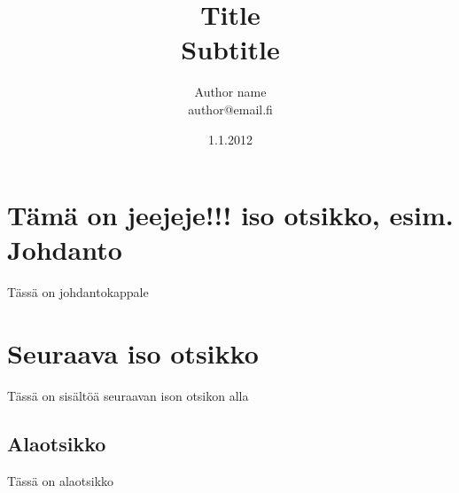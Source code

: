 \documentclass[a4paper]{article}
\begin{document}
\title{\huge Title \\ \large Subtitle}
\date{1.1.2012}
\author{Author name \\ author@email.fi}
\maketitle

\large

\section{Tämä on jeejeje!!! iso otsikko, esim. Johdanto}

Tässä on johdantokappale

\section{Seuraava iso otsikko}

Tässä on sisältöä seuraavan ison otsikon alla

\subsection{Alaotsikko}

Tässä on alaotsikko

\end{document}
